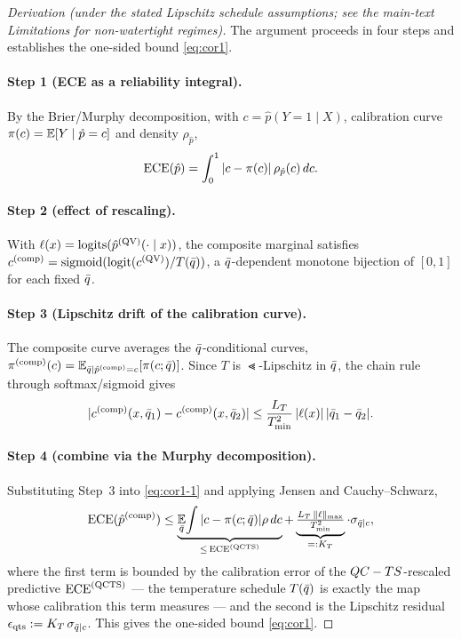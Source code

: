 \begin{proof}[Derivation (under the stated Lipschitz schedule assumptions; see the main-text
Limitations for non-watertight regimes)]
The argument proceeds in four steps and establishes the one-sided bound \eqref{eq:cor1}.

\paragraph{Step 1 (ECE as a reliability integral).}
By the Brier/Murphy decomposition, with $c=\hat{p}(Y=1\mid X)$, calibration curve
$\pi(c)=\operatorname*{\mathbb{E}}[Y\mid\hat{p}=c]$ and density $\rho_{\hat{p}}$,
\begin{equation}
\operatorname{ECE}(\hat{p}) = \int_0^1 |c - \pi(c)|\,\rho_{\hat{p}}(c)\,dc.
\label{eq:cor1-1}
\end{equation}

\paragraph{Step 2 (effect of \qcts{} rescaling).}
With $\ell(x)=\mathrm{logits}(\hat{p}^{(\mathrm{QV})}(\cdot\mid x))$, the composite marginal satisfies
$c^{(\mathrm{comp})} = \operatorname{sigmoid}(\mathrm{logit}(c^{(\mathrm{QV})})/T(\bar{q}))$, a
$\bar{q}$-dependent monotone bijection of $[0,1]$ for each fixed $\bar{q}$.

\paragraph{Step 3 (Lipschitz drift of the calibration curve).}
The composite curve averages the $\bar{q}$-conditional curves,
$\pi^{(\mathrm{comp})}(c)=\operatorname*{\mathbb{E}}_{\bar{q}\mid\hat{p}^{(\mathrm{comp})}=c}[\pi(c;\bar{q})]$. Since $T$ is $\Lt$-Lipschitz in
$\bar{q}$, the chain rule through softmax/sigmoid gives
\begin{equation}
|c^{(\mathrm{comp})}(x,\bar{q}_1)-c^{(\mathrm{comp})}(x,\bar{q}_2)|
\leq \frac{L_T}{T_{\min}^2}\,|\ell(x)|\,|\bar{q}_1-\bar{q}_2|.
\label{eq:cor1-3}
\end{equation}

\paragraph{Step 4 (combine via the Murphy decomposition).}
Substituting Step~3 into \eqref{eq:cor1-1} and applying Jensen and Cauchy--Schwarz,
\begin{equation}
\operatorname{ECE}(\hat{p}^{(\mathrm{comp})})
\leq \underbrace{\operatorname*{\mathbb{E}}_{\bar{q}}\!\int|c-\pi(c;\bar{q})|\rho\,dc}_{\leq\,\operatorname{ECE}^{(\mathrm{QCTS})}}
+ \underbrace{\tfrac{L_T\,\|\ell\|_{\max}}{T_{\min}^2}}_{=:K_T}\cdot\sigma_{\bar{q}\mid c},
\label{eq:cor1-4}
\end{equation}
where the first term is bounded by the calibration error of the $QC-TS$-rescaled predictive
$\operatorname{ECE}^{(\mathrm{QCTS})}$ --- the temperature schedule $T(\bar{q})$ is exactly the map whose
calibration this term measures --- and the second is the Lipschitz residual
$\epsilon_{\mathrm{qts}} := K_T\,\sigma_{\bar{q}\mid c}$. This gives the one-sided bound \eqref{eq:cor1}.
\end{proof}

